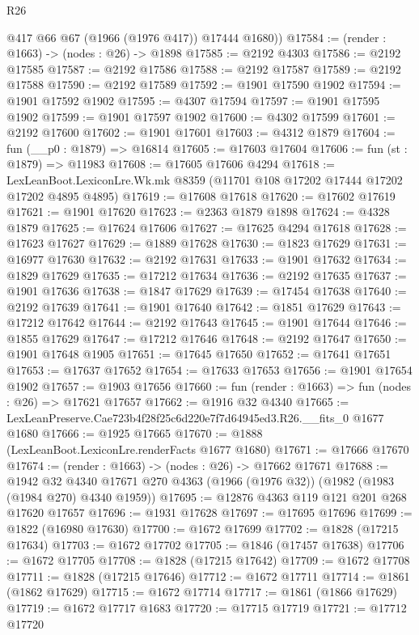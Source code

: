 \begin{lexlean}{R26}
\begin{coremodule}
        @417
        @66
        @67
        (@1966 (@1976 @417))
        @17444
        @1680))
@17584 := (render : @1663) -> (nodes : @26) -> @1898
@17585 := @2192 @4303
@17586 := @2192 @17585
@17587 := @2192 @17586
@17588 := @2192 @17587
@17589 := @2192 @17588
@17590 := @2192 @17589
@17592 := @1901 @17590 @1902
@17594 := @1901 @17592 @1902
@17595 := @4307 @17594
@17597 := @1901 @17595 @1902
@17599 := @1901 @17597 @1902
@17600 := @4302 @17599
@17601 := @2192 @17600
@17602 := @1901 @17601
@17603 := @4312 @1879
@17604 := fun (__p0 : @1879) => @16814
@17605 := @17603 @17604
@17606 := fun (st : @1879) => @11983
@17608 := @17605 @17606 @4294
@17618 := LexLeanBoot.LexiconLre.Wk.mk @8359 (@11701 @108 @17202 @17444 @17202 @17202 @4895 @4895)
@17619 := @17608 @17618
@17620 := @17602 @17619
@17621 := @1901 @17620
@17623 := @2363 @1879 @1898
@17624 := @4328 @1879
@17625 := @17624 @17606
@17627 := @17625 @4294 @17618
@17628 := @17623 @17627
@17629 := @1889 @17628
@17630 := @1823 @17629
@17631 := @16977 @17630
@17632 := @2192 @17631
@17633 := @1901 @17632
@17634 := @1829 @17629
@17635 := @17212 @17634
@17636 := @2192 @17635
@17637 := @1901 @17636
@17638 := @1847 @17629
@17639 := @17454 @17638
@17640 := @2192 @17639
@17641 := @1901 @17640
@17642 := @1851 @17629
@17643 := @17212 @17642
@17644 := @2192 @17643
@17645 := @1901 @17644
@17646 := @1855 @17629
@17647 := @17212 @17646
@17648 := @2192 @17647
@17650 := @1901 @17648 @1905
@17651 := @17645 @17650
@17652 := @17641 @17651
@17653 := @17637 @17652
@17654 := @17633 @17653
@17656 := @1901 @17654 @1902
@17657 := @1903 @17656
@17660 := fun (render : @1663) => fun (nodes : @26) => @17621 @17657
@17662 := @1916 @32 @4340
@17665 := LexLeanPreserve.Cae723b4f28f25c6d220e7f7d64945ed3.R26.__fits_0 @1677 @1680
@17666 := @1925 @17665
@17670 := @1888 (LexLeanBoot.LexiconLre.renderFacts @1677 @1680)
@17671 := @17666 @17670
@17674 := (render : @1663) -> (nodes : @26) -> @17662 @17671
@17688 := @1942
    @32
    @4340
    @17671
    @270
    @4363
    (@1966 (@1976 @32))
    (@1982 (@1983 (@1984 @270) @4340 @1959))
@17695 := @12876 @4363 @119 @121 @201 @268 @17620 @17657
@17696 := @1931 @17628
@17697 := @17695 @17696
@17699 := @1822 (@16980 @17630)
@17700 := @1672 @17699
@17702 := @1828 (@17215 @17634)
@17703 := @1672 @17702
@17705 := @1846 (@17457 @17638)
@17706 := @1672 @17705
@17708 := @1828 (@17215 @17642)
@17709 := @1672 @17708
@17711 := @1828 (@17215 @17646)
@17712 := @1672 @17711
@17714 := @1861 (@1862 @17629)
@17715 := @1672 @17714
@17717 := @1861 (@1866 @17629)
@17719 := @1672 @17717 @1683
@17720 := @17715 @17719
@17721 := @17712 @17720

\end{coremodule}
\end{lexlean}
